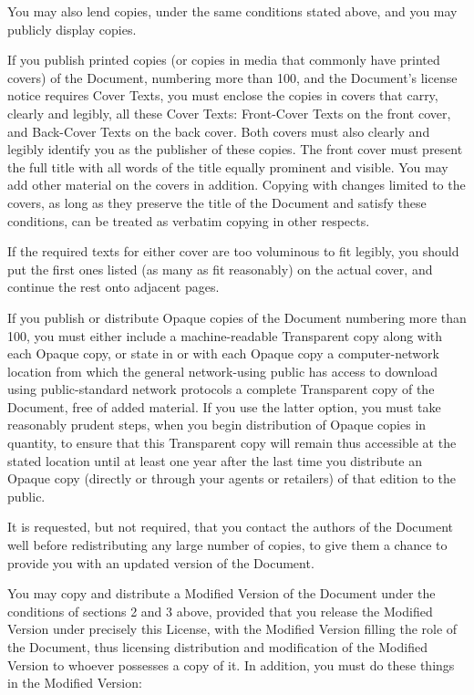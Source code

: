 \begin{BookLicense}
You may also lend copies, under the same conditions stated above, and you may publicly display copies.

If you publish printed copies (or copies in media that commonly have printed covers) of the Document, numbering more than 100, and the Document's license notice requires Cover Texts, you must enclose the copies in covers that carry, clearly and legibly, all these Cover Texts: Front-Cover Texts on the front cover, and Back-Cover Texts on the back cover. Both covers must also clearly and legibly identify you as the publisher of these copies. The front cover must present the full title with all words of the title equally prominent and visible. You may add other material on the covers in addition. Copying with changes limited to the covers, as long as they preserve the title of the Document and satisfy these conditions, can be treated as verbatim copying in other respects.

If the required texts for either cover are too voluminous to fit legibly, you should put the first ones listed (as many as fit reasonably) on the actual cover, and continue the rest onto adjacent pages.

If you publish or distribute Opaque copies of the Document numbering more than 100, you must either include a machine-readable Transparent copy along with each Opaque copy, or state in or with each Opaque copy a computer-network location from which the general network-using public has access to download using public-standard network protocols a complete Transparent copy of the Document, free of added material. If you use the latter option, you must take reasonably prudent steps, when you begin distribution of Opaque copies in quantity, to ensure that this Transparent copy will remain thus accessible at the stated location until at least one year after the last time you distribute an Opaque copy (directly or through your agents or retailers) of that edition to the public.

It is requested, but not required, that you contact the authors of the Document well before redistributing any large number of copies, to give them a chance to provide you with an updated version of the Document.

You may copy and distribute a Modified Version of the Document under the conditions of sections 2 and 3 above, provided that you release the Modified Version under precisely this License, with the Modified Version filling the role of the Document, thus licensing distribution and modification of the Modified Version to whoever possesses a copy of it. In addition, you must do these things in the Modified Version:


\end{BookLicense}

